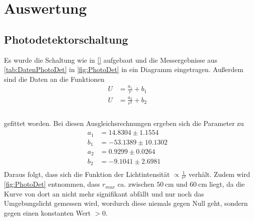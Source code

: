 \section{Auswertung}
\label{sec:Auswertung}
\subsection{Photodetektorschaltung}
\label{subsec:PhotDet}
Es wurde die Schaltung wie in \autoref{} aufgebaut und die Messergebnisse aus \autoref{tab:DatenPhotoDet} in \autoref{fig:PhotoDet} in ein Diagramm eingetragen.
Außerdem sind die Daten an die Funktionen
\begin{align*}
    U &= \frac{a_1}{r} + b_1\\
    U &= \frac{a_2}{r^2} + b_2\\
\end{align*}
\\
gefittet worden. Bei diesen Ausgleichsrechnungen ergeben sich die Parameter zu
\begin{align*}
  a_1 &= 14.8304\pm 1.1554\\
  b_1 &= -53.1389\pm 10.1302\\
  a_2 &= 0.9299\pm 0.0264\\
  b_2 &= -9.1041\pm 2.6981\\
\end{align*}
Daraus folgt, dass sich die Funktion der Lichtintensität $\varpropto \frac{1}{r^2}$ verhält. Zudem wird \autoref{fig:PhotoDet}
entnommen, dass $r_{max}$ ca. zwischen $\SI{50}{\centi\meter}$ und $\SI{60}{\centi\meter}$ liegt, da die Kurve von dort an nicht mehr signifikant abfällt und nur noch
das Umgebungslicht gemessen wird, wordurch diese niemals gegen Null geht, sondern gegen einen konstanten Wert $>0$.

